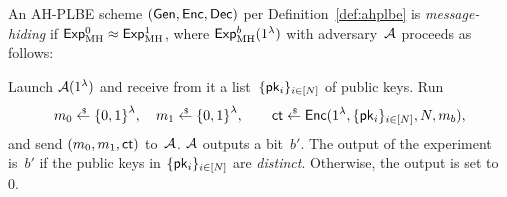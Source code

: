 \begin{definition}\label{def:ahplbe-message-hiding}
An AH-PLBE scheme $({\smash{\mathsf{Gen}}},{\smash{\mathsf{Enc}}},{\smash{\mathsf{Dec}}})$ per Definition~\ref{def:ahplbe}
is \emph{message-hiding} if ${{\smash{\mathsf{Exp}}_{\textup{MH}}^{0}}\approx{\smash{\mathsf{Exp}}_{\textup{MH}}^{1}}}$,
where ${\smash{\mathsf{Exp}}_{\textup{MH}}^{b}}(1^\lambda)$ with adversary~${\mathcal{A}}$ proceeds as follows:
\begin{security}
Launch ${\mathcal{A}}(1^\lambda)$ and
receive from it a list~$\{{\smash{\mathsf{pk}}}_i\}_{i\in[N]}$ of public keys.
Run
\begin{align*}
m_0\draws\bit^\lambda,\quad
m_1\draws\bit^\lambda,\qquad
\ct\draws\Enc(1^\lambda,\{\pk_i\}_{i\in[N]},N,m_b),
\end{align*}
and send $(m_0,m_1,{\smash{\mathsf{ct}}})$ to~${\mathcal{A}}$.
${\mathcal{A}}$ outputs a bit~$b'$.
The output of the experiment is~$b'$
if the public keys in $\{{\smash{\mathsf{pk}}}_i\}_{i\in[N]}$ are \emph{distinct}.
Otherwise, the output is set to~$0$.
\end{security}
\end{definition}
